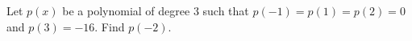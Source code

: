 Let $p(x)$ be a polynomial of degree $3$ such that $p(-1)=p(1)=p(2)=0$ and $p(3)=-16$. Find $p(-2)$.
